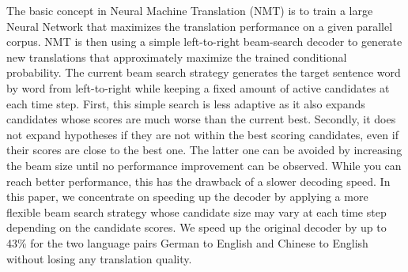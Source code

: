 The basic concept in Neural Machine Translation (NMT) is to train a large Neural Network that maximizes the translation performance on a given parallel corpus. NMT is then using a simple left-to-right beam-search decoder to generate new translations that approximately maximize the trained conditional probability. The current beam search strategy generates the target sentence word by word from left-to-right while keeping a fixed amount of active candidates at each time step. First, this simple search is less adaptive as it also expands candidates whose scores are much worse than the current best. Secondly, it does not expand hypotheses if they are not within the best scoring candidates, even if their scores are close to the best one. The latter one can be avoided by increasing the beam size until no performance improvement can be observed. While you can reach better performance, this has the drawback of a slower decoding speed. In this paper, we concentrate on speeding up the decoder by applying a more flexible beam search strategy whose candidate size may vary at each time step depending on the candidate scores. We speed up the original decoder by up to 43\% for the two language pairs German to English and Chinese to English without losing any translation quality.
